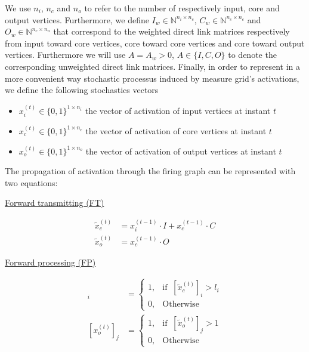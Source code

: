 \documentclass[a4paper, 11pt]{article}
\begin{document}
We use $n_i$, $n_c$ and $n_o$ to refer to the number of respectively input, core and output vertices. Furthermore, we define $I_w \in \mathbb{N}^{n_i \times n_c}$, $C_w \in \mathbb{N}^{n_c \times n_c}$ and $O_w \in \mathbb{N}^{n_c \times n_o}$ that correspond to the weighted direct link matrices respectively from input toward core vertices, core toward core vertices and core toward output vertices. Furthermore we will use $A = A_w > 0$, $A \in \{I, C, O \}$ to denote the corresponding unweighted direct link matrices. Finally, in order to represent in a more convenient way stochastic processus induced by measure grid's activations, we define the following stochastics vectors

\begin{itemize}
\item $x_i^{(t)} \in \{0, 1\}^{1 \times n_i}$ the vector of activation of input vertices at instant $t$
\item $x_c^{(t)} \in \{0, 1\}^{1 \times n_c}$ the vector of activation of core vertices at instant $t$
\item $x_o^{(t)} \in \{0, 1\}^{1 \times n_o}$ the vector of activation of output vertices at instant $t$

\end{itemize}

The propagation of activation through the firing graph can be represented with two equations:\\


\vspace{20px}\noindent\begin{minipage}{.5\linewidth}
\begin{center}
\underline{Forward transmitting (FT)}
\end{center}
\begin{align*}
\tilde{x}_c^{(t)} &= x_i^{(t-1)} \cdot I + x_c^{(t-1)} \cdot C  \\
\tilde{x}_o^{(t)} &= x_c^{(t-1)} \cdot O
\end{align*} 
\end{minipage}%
\noindent\begin{minipage}{.5\linewidth}
\begin{center}
\underline{Forward processing (FP)}
\end{center}
\begin{align*}
[x_c^{(t)}]_i &= \begin{cases} 1, & \text{if }\ [\tilde{x}_c^{(t)}]_i > l_i \\ 0, & \text{Otherwise} \end{cases}\\
[x_o^{(t)}]_j &= \begin{cases} 1, & \text{if }\ [\tilde{x}_o^{(t)}]_j > 1 \\ 0, & \text{Otherwise} \end{cases}  
\end{align*}
\end{minipage}\vspace{20px}
\end{document}
